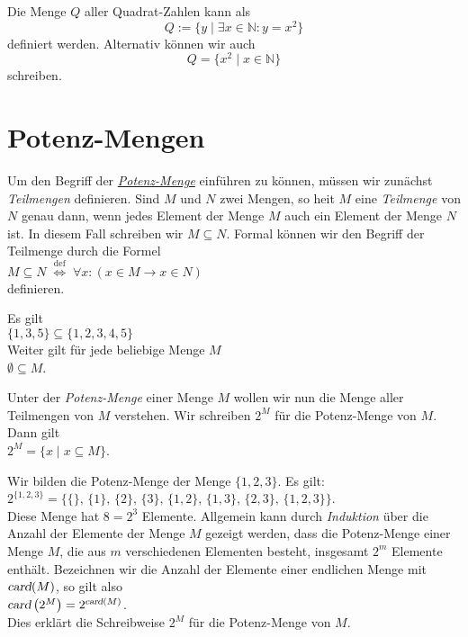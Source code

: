 \example
Die Menge $Q$ aller Quadrat-Zahlen kann als 
\[ Q := \{ y \mid \exists x \in \mathbb{N}: y = x^2\} \]
definiert werden.  Alternativ k\"{o}nnen wir auch 
\[ Q = \bigl\{ x^2 \mid x \in \mathbb{N} \bigr\} \]
schreiben.
\eox

\section{Potenz-Mengen}
Um den Begriff der \href{https://de.wikipedia.org/wiki/Potenzmenge}{\emph{Potenz-Menge}}
einf\"{u}hren zu k\"{o}nnen, m\"{u}ssen wir zun\"{a}chst \emph{Teilmengen} definieren.  Sind $M$ und
$N$ zwei Mengen, so hei\3t $M$ eine \emph{Teilmenge} von $N$ genau dann, wenn jedes Element der
Menge $M$ auch ein Element der Menge $N$ ist.  In diesem Fall schreiben wir $M \subseteq N$.  Formal
k\"{o}nnen wir den Begriff der Teilmenge durch die Formel
 \\[0.2cm]
\hspace*{1.3cm}
$M \subseteq N \;\stackrel{\mathrm{def}}{\Longleftrightarrow}\; \forall x: (x \in M \rightarrow x \in N)$ 
 \\[0.2cm]
definieren.

\example
Es gilt 
\\[0.2cm]
\hspace*{1.3cm}
$\{ 1, 3, 5\} \subseteq \{ 1, 2, 3, 4, 5 \}$
\\[0.2cm]
Weiter gilt f\"{u}r jede beliebige Menge $M$
\\[0.2cm]
\hspace*{1.3cm}
$\emptyset \subseteq M$. \eox


Unter der \emph{Potenz-Menge} einer Menge $M$ wollen wir nun die Menge aller Teilmengen
von $M$ verstehen.  Wir schreiben $2^M$ f\"{u}r die Potenz-Menge von $M$.  Dann gilt \\[0.2cm]
\hspace*{1.3cm} $2^M = \{ x \;|\; x \subseteq M \}$.
\vspace{0.2cm}

\example
Wir bilden  die Potenz-Menge der Menge $\{1,2,3\}$.  Es gilt: \\[0.2cm]
\hspace*{1.3cm} $2^{\{1,2,3\}} = \big\{ \{\},\, \{1\}, \, \{2\},\, \{3\},\, \{1,2\}, \, \{1,3\}, \, \{2,3\},\, \{1,2,3\}\big\}$. \\[0.2cm]
Diese Menge hat $8 = 2^3$ Elemente.  Allgemein kann durch \emph{Induktion} \"{u}ber die Anzahl der
Elemente der Menge $M$ gezeigt werden, dass die 
Potenz-Menge einer Menge $M$, die aus $m$ verschiedenen Elementen besteht, insgesamt $2^m$ 
Elemente enth\"{a}lt.  Bezeichnen wir die Anzahl der Elemente einer endlichen Menge mit
$\textsl{card}(M)$, so gilt also
\\[0.2cm]
\hspace*{1.3cm}
$\textsl{card}\left(2^M\right) = 2^{\textsl{card}(M)}$.
\\[0.2cm]
Dies erkl\"{a}rt die Schreibweise $2^M$ f\"{u}r die Potenz-Menge von $M$.  \eox



